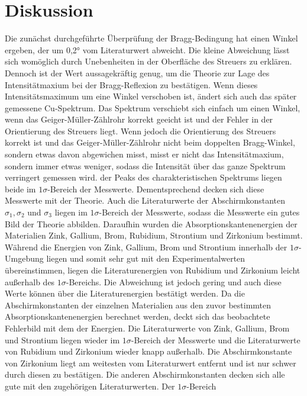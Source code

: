 \documentclass[titlepage = firstcover]{scrartcl}
\begin{document}
          \section{Diskussion}
            Die zunächst durchgeführte Überprüfung der Bragg-Bedingung hat einen Winkel ergeben, der um 0,2° vom Literaturwert abweicht. Die kleine Abweichung lässt sich womöglich durch Unebenheiten
            in der Oberfläche des Streuers zu erklären. Dennoch ist der Wert aussagekräftig genug, um die Theorie zur Lage des Intensitätmaxium bei der Bragg-Reflexion zu bestätigen. Wenn dieses
            Intensitätsmaximum um eine Winkel verschoben ist, ändert sich auch das später gemessene Cu-Spektrum. Das Spektrum verschiebt sich einfach um einen Winkel, wenn das Geiger-Müller-Zählrohr
            korrekt geeicht ist und der Fehler in der Orientierung des Streuers liegt. Wenn jedoch die Orientierung des Streuers korrekt ist und das Geiger-Müller-Zählrohr nicht beim doppelten
            Bragg-Winkel, sondern etwas davon abgewichen misst, misst er nicht das Intensitätmaxium, sondern immer etwas weniger, sodass die Intensität über das ganze Spektrum verringert gemessen wird.
            der Peaks des charakteristischen Spektrums liegen beide im $1\sigma$-Bereich der Messwerte. Dementsprechend decken sich diese Messwerte mit der Theorie. Auch die Literaturwerte der 
            Abschirmkonstanten $\sigma_1, \sigma_2$ und $\sigma_3$ liegen im $1\sigma$-Bereich der Messwerte, sodass die Messwerte ein gutes Bild der Theorie abbilden.
            Daraufhin wurden die Absorptionskantenenergien der Materialien Zink, Gallium, Brom, Rubidium, Strontium und Zirkonium bestimmt. Während die Energien von Zink, Gallium, Brom und Strontium
            innerhalb der $1\sigma$-Umgebung liegen und somit sehr gut mit den Experimentalwerten übereinstimmen, liegen die Literaturenergien von Rubidium und Zirkonium leicht außerhalb des 
            $1\sigma$-Bereichs. Die Abweichung ist jedoch gering und auch diese Werte können über die Literaturenergien bestätigt werden. Da die Abschirmkonstanten der einzelnen Materialien aus 
            den zuvor bestimmten Absorptionskantenenergien berechnet werden, deckt sich das beobachtete Fehlerbild mit dem der Energien. Die Literaturwerte von Zink, Gallium, Brom und Strontium
            liegen wieder im $1\sigma$-Bereich der Messwerte und die Literaturwerte von Rubidium und Zirkonium wieder knapp außerhalb. Die Abschirmkonstante von Zirkonium liegt am weitesten vom 
            Literaturwert entfernt und ist nur schwer durch diesen zu bestätigen. Die anderen Abschirmkonstanten decken sich alle gute mit den zugehörigen Literaturwerten. Der $1\sigma$-Bereich 
\end{document}
